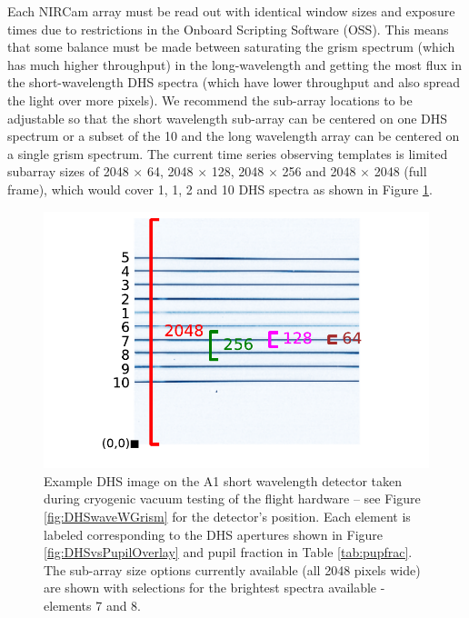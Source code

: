 \documentclass[iop]{emulateapj}
\begin{document}
Each NIRCam array must be read out with identical window sizes and exposure times due to restrictions in the Onboard Scripting Software (OSS).
This means that some balance must be made between saturating the grism spectrum (which has much higher throughput) in the long-wavelength and getting the most flux in the short-wavelength DHS spectra (which have lower throughput and also spread the light over more pixels).
We recommend  the sub-array locations to be adjustable so that the short wavelength sub-array can be centered on one DHS spectrum or a subset of the 10 and the long wavelength array can be centered on a single grism spectrum.
The current time series observing templates is limited subarray sizes of 2048 $\times$ 64, 2048 $\times$ 128, 2048 $\times$ 256 and 2048 $\times$ 2048 (full frame), which would cover 1, 1, 2 and 10 DHS spectra as shown in Figure \ref{fig:DHSaps}.

\begin{figure}[!t]
\includegraphics[width=1.0\columnwidth]{example_ap_sizes.pdf}
\caption{Example DHS image on the A1 short wavelength detector taken during cryogenic vacuum testing of the flight hardware -- see Figure \ref{fig:DHSwaveWGrism} for the detector's position.
Each element is labeled corresponding to the DHS apertures shown in Figure \ref{fig:DHSvsPupilOverlay} and pupil fraction in Table \ref{tab:pupfrac}.
The sub-array size options currently available (all 2048 pixels wide) are shown with selections for the brightest spectra available - elements 7 and 8.}\label{fig:DHSaps}
\end{figure}
\end{document}
